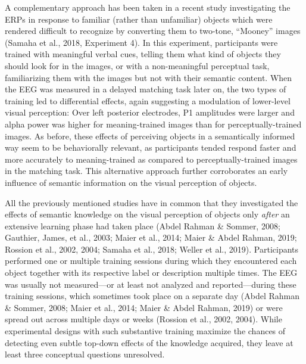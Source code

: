 \documentclass[
  english,
  man,floatsintext]{apa7}
\begin{document}
A complementary approach has been taken in a recent study investigating the ERPs in response to familiar (rather than unfamiliar) objects which were rendered difficult to recognize by converting them to two-tone, \enquote{Mooney} images (Samaha et al., 2018, Experiment 4). In this experiment, participants were trained with meaningful verbal cues, telling them what kind of objects they should look for in the images, or with a non-meaningful perceptual task, familiarizing them with the images but not with their semantic content. When the EEG was measured in a delayed matching task later on, the two types of training led to differential effects, again suggesting a modulation of lower-level visual perception: Over left posterior electrodes, P1 amplitudes were larger and alpha power was higher for meaning-trained images than for perceptually-trained images. As before, these effects of perceiving objects in a semantically informed way seem to be behaviorally relevant, as participants tended respond faster and more accurately to meaning-trained as compared to perceptually-trained images in the matching task. This alternative approach further corroborates an early influence of semantic information on the visual perception of objects.

All the previously mentioned studies have in common that they investigated the effects of semantic knowledge on the visual perception of objects only \emph{after} an extensive learning phase had taken place (Abdel Rahman \& Sommer, 2008; Gauthier, James, et al., 2003; Maier et al., 2014; Maier \& Abdel Rahman, 2019; Rossion et al., 2002, 2004; Samaha et al., 2018; Weller et al., 2019). Participants performed one or multiple training sessions during which they encountered each object together with its respective label or description multiple times. The EEG was usually not measured---or at least not analyzed and reported---during these training sessions, which sometimes took place on a separate day (Abdel Rahman \& Sommer, 2008; Maier et al., 2014; Maier \& Abdel Rahman, 2019) or were spread out across multiple days or weeks (Rossion et al., 2002, 2004). While experimental designs with such substantive training maximize the chances of detecting even subtle top-down effects of the knowledge acquired, they leave at least three conceptual questions unresolved.
\end{document}
